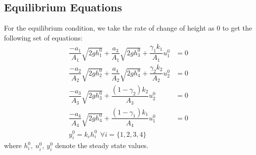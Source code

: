 \documentclass[10pt,a4paper, twocolumn]{article}
\begin{document}
\subsection{Equilibrium Equations}
For the equilibrium condition, we take the rate of change of height as 0 to get the following set of equations:
\begin{align*}
\dfrac{-a_1}{A_1}\sqrt{2gh_1^0} + \dfrac{a_3}{A_1} \sqrt{2gh_3^0} + \dfrac{\gamma _1 k_1}{A_1}u_1^0 &= 0\\
\dfrac{-a_2}{A_2}\sqrt{2gh_2^0} + \dfrac{a_4}{A_2} \sqrt{2gh_4^0} + \dfrac{\gamma _2 k_2}{A_2}u_2^0 &= 0\\
\dfrac{-a_3}{A_3}\sqrt{2gh_3^0} + \dfrac{(1- \gamma _2) k_2}{A_3}u_2^0 &= 0\\
\dfrac{-a_4}{A_4}\sqrt{2gh_4^0} + \dfrac{(1- \gamma _1) k_1}{A_4}u_1^0 &= 0 \\
y_i^0 = k_c h_i^0 \ \ \forall i = \{1,2,3,4\}
\end{align*}
where $h_i^0, \ u_i^0, \ y_i^0$ denote the steady state values.
\end{document}
